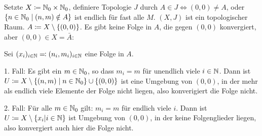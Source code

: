 \documentclass{article}
\begin{document}
Setzte $X\mathrel{\mbox{$\coloneqq$}} \mathbb{N}_0\times \mathbb{N}_0$, definiere Topologie $J$ durch $A\in J \iff (0,0) \ne A$, oder $\{n\in\mathbb{N}_0\mid (n,m)\notin A\}$ ist endlich für fast alle $M$. $(X,J)$ ist ein topologischer Raum. $A\mathrel{\mbox{$\coloneqq$}} X\setminus \{(0,0)\}$. Es gibt keine Folge in $A$, die gegen $(0,0)$ konvergiert, aber $(0,0)\in X = \bar A$:

Sei $(x_i)_{i\in \mathbb{N}} \mathrel{\mbox{$\eqqcolon$}} (n_i,m_i)_{i\in\mathbb{N}}$ eine Folge in $A$.

1. Fall: Es gibt  ein $m\in \mathbb{N}_0$, so dass $m_i=m$ für unendlich viele $i\in\mathbb{N}$. Dann ist $U\mathrel{\mbox{$\coloneqq$}} X\setminus \{(n,m)\mid n\in \mathbb{N}_0\}\cup\{(0,0)\}$ ist eine Umgebung von $(0,0)$, in der mehr als endlich viele Elemente der Folge nicht liegen, also konverigiert die Folge nicht.

2. Fall: Für alle $m\in \mathbb{N}_0$ gilt: $m_i=m$ für endlich viele $i$. Dann ist $U\mathrel{\mbox{$\coloneqq$}} X\setminus\{x_i|i\in \mathbb{N}\}$ ist Umgebung von $(0,0)$, in der keine Folgenglieder liegen, also konvergiert auch hier die Folge nicht.
\end{document}
